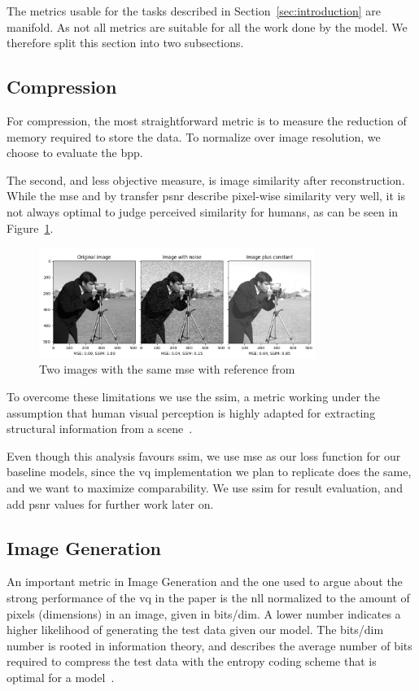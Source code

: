 The metrics usable for the tasks described in Section~\ref{sec:introduction} are manifold.
As not all metrics are suitable for all the work done by the model.
We therefore split this section into two subsections.

\subsection{Compression}\label{subsec:compression}
For compression, the most straightforward metric is to measure the reduction of memory required to
store the data.
To normalize over image resolution, we choose to evaluate the \ac{bpp}.

The second, and less objective measure, is image similarity after reconstruction.
While the \ac{mse} and by transfer \ac{psnr} describe pixel-wise similarity very well, it is not
always optimal to judge perceived similarity for humans, as can be seen in Figure~\ref{fig:mse_ssim}.

\begin{figure}[ht]
    \centering
    \includegraphics[width=0.8\textwidth]{images/ssim_mse}
    \caption{Two images with the same \ac{mse} with reference from~\cite{scikit-ssim}}
    \label{fig:mse_ssim}
\end{figure}

To overcome these limitations we use the \ac{ssim}, a metric working under the assumption that human visual
perception is highly adapted for extracting structural information from a scene~\cite{ssim}.

Even though this analysis favours \ac{ssim}, we use \ac{mse} as our loss function for our baseline models,
since the \ac{vq} implementation we plan to replicate does the same, and we want to maximize comparability.
We use \ac{ssim} for result evaluation, and add \ac{psnr} values for further work later on.

\subsection{Image Generation}\label{subsec:image-generation}
An important metric in Image Generation and the one used to argue about the strong performance of the \ac{vq} in the
paper is the \ac{nll} normalized to the amount of pixels (dimensions) in an image, given in bits/dim.
A lower number indicates a higher likelihood of generating the test data given our model.
The bits/dim number is rooted in information theory, and describes the average number of bits required to
compress the test data with the entropy coding scheme that is optimal for a model~\cite{shannon}.

